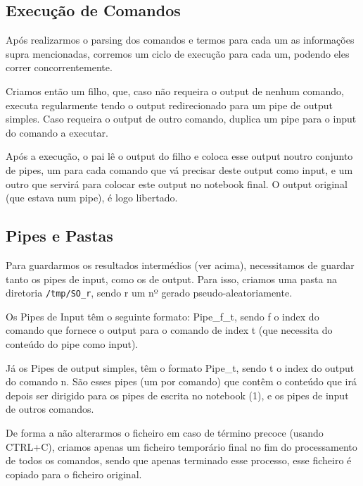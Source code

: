 \documentclass[a4paper]{article}
\begin{document}
	\subsection{Execução de Comandos}
		\tab Após realizarmos o parsing dos comandos e termos para cada um as informações
		supra mencionadas, corremos um ciclo de execução para cada um, podendo eles
		correr concorrentemente.
		\par Criamos então um filho, que, caso não requeira o output de nenhum comando,
		executa regularmente tendo o output redirecionado para um pipe de output simples. Caso
		requeira o output de outro comando, duplica um pipe para o input do comando a executar.
		\par Após a execução, o pai lê o output do filho e coloca esse output noutro conjunto
		de pipes, um para cada comando que vá precisar deste output como input, e um outro
		que servirá para colocar este output no notebook final. O output original (que estava num pipe),
		é logo libertado.

	\subsection{Pipes e Pastas}
		\tab Para guardarmos os resultados intermédios (ver acima), necessitamos de guardar
		tanto os pipes de input, como os de output. Para isso, criamos uma pasta na diretoria
		\texttt{/tmp/SO\_r}, sendo r um nº gerado pseudo-aleatoriamente.
		\par Os Pipes de Input têm o seguinte formato: Pipe\_f\_t, sendo
		f o index do comando que fornece o output para o comando de index t (que necessita do conteúdo do pipe como input).
		\par Já os Pipes de output simples, têm o formato Pipe\_t, sendo t o index do output
		do comando n. São esses pipes (um por comando) que contêm o conteúdo que irá depois ser dirigido para os pipes
		de escrita no notebook (1), e os pipes de input de outros comandos.
		\par De forma a não alterarmos o ficheiro em caso de término precoce (usando CTRL+C),
		criamos apenas um ficheiro temporário final no fim do processamento de todos os comandos,
		sendo que apenas terminado esse processo, esse ficheiro é copiado para o ficheiro
		original.
\end{document}
